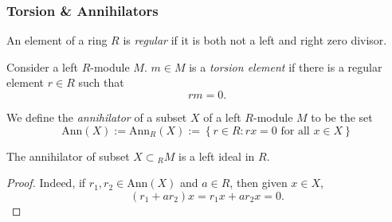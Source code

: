 \subsubsection{Torsion \& Annihilators}
\begin{definition}
    An element of a ring $R$ is \emph{regular} if it is both not a left and right zero divisor.
\end{definition}
\begin{definition}
    Consider a left $R$-module $M$. $m\in M$ is a \emph{torsion element} if there is a regular element $r\in R$ such that 
    $$
        rm = 0.
    $$
\end{definition}
\begin{definition}
    We define the \emph{annihilator} of a subset $X$ of a left $R$-module $M$ to be the set 
    $$
        \mathrm{Ann}(X):=\mathrm{Ann}_R(X) := \left\{ r\in R : rx = 0 \text{ for all } x\in X \right\}
    $$ 
\end{definition}
\begin{lemma}
    The annihilator of subset $X\subset {_RM}$ is a left ideal in $R$. 
\end{lemma}
\begin{proof}
    Indeed, if $r_1,r_2\in \mathrm{Ann}(X)$ and $a\in R$, then given $x\in X$,
    $$
        (r_1+ar_2)x= r_1x+ar_2x = 0.
    $$
\end{proof}

